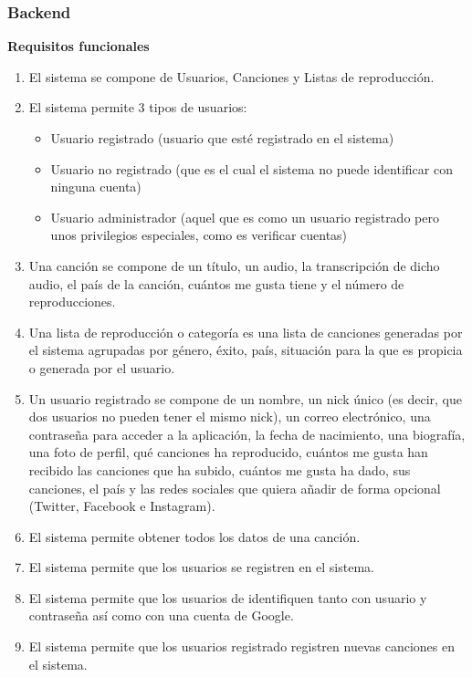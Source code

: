 \documentclass[12pt]{article}%
\begin{document}
\subsubsection{Backend}
\textbf{Requisitos funcionales}
\begin{enumerate}

	\item El sistema se compone de Usuarios, Canciones y Listas de reproducci\'on.
	\item El sistema permite 3 tipos de usuarios:
	\begin{itemize}
		\item Usuario registrado (usuario que est\'e registrado en el sistema)
		\item Usuario no registrado (que es el cual el sistema no puede identificar con ninguna cuenta)
		\item Usuario administrador (aquel que es como un usuario registrado pero unos privilegios especiales, como es verificar cuentas)
	\end{itemize}
	\item Una canci\'on se compone de un t\'itulo, un audio, la transcripci\'on de dicho audio, el pa\'is de la canci\'on, cu\'antos me gusta tiene y el n\'umero de reproducciones.
	\item Una lista de reproducci\'on o categor\'ia es una lista de canciones generadas por el sistema agrupadas por g\'enero, \'exito, pa\'is, situaci\'on para la que es propicia o generada por el usuario.
	\item Un usuario registrado se compone de un nombre, un nick \'unico (es decir, que dos usuarios no pueden tener el mismo nick), un correo electr\'onico, una contrase\~na para acceder a la aplicaci\'on, la fecha de nacimiento, una biograf\'ia, una foto de perfil, qu\'e canciones ha reproducido, cu\'antos me gusta han recibido las canciones que ha subido, cu\'antos me gusta ha dado, sus canciones, el pa\'is y las redes sociales que quiera a\~nadir de forma opcional (Twitter, Facebook e Instagram).
	
	\item El sistema permite obtener todos los datos de una canci\'on.
	
	
	\item El sistema permite que los usuarios se registren en el sistema.
	\item El sistema permite que los usuarios de identifiquen tanto con usuario y contrase\~na as\'i como con una cuenta de Google.
	\item El sistema permite que los usuarios registrado registren nuevas canciones en el sistema.
	

\end{enumerate}
\end{document}
